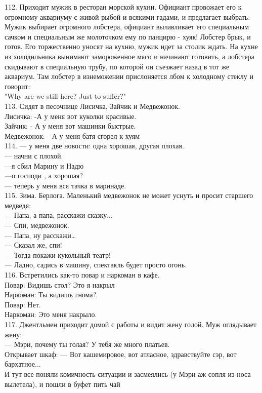 \documentclass[a4paper,20pt,notitlepage]{extbook}
\begin{document}
	112. Приходит мужик в ресторан морской кухни.  Официант провожает его к огромному аквариуму с живой рыбой и всякими гадами, и предлагает выбрать.  Мужик выбирает огромного лобстера, официант вылавливает его специальным сачком и специальным же молоточком ему по панцирю - хуяк! Лобстер брык, и готов. Его торжественно уносят на кухню, мужик идет за столик ждать.  На кухне из холодильника вынимают замороженное мясо и начинают готовить, а лобстера скидывают в специальную трубу, по которой он съезжает назад в тот же аквариум.  Там лобстер в изнеможении прислоняется лбом к холодному стеклу и говорит:\\
	 "Why are we still here? Just to suffer?"\\
	 
	113. Сидят в песочнице Лисичка, Зайчик и Медвежонок.\\
	Лисичка: -А у меня вот куколки красивые.\\
	Зайчик: - А у меня вот машинки быстрые.\\
	Медвежонок: - А у меня батя сгорел к хуям\\
	
	114. — у меня две новости: одна хорошая, другая плохая.\\
	— начни с плохой.\\
	—я сбил Марину и Надю\\
	—о господи , а хорошая?\\
	— теперь у меня вся тачка в маринаде.\\
	
	115. Зима. Берлога. Маленький медвежонок не может уснуть и просит старшего медведя:\\
	— Папа, а папа, расскажи сказку...\\
	— Спи, медвежонок.\\
	— Папа, ну расскажи…\\
	— Сказал же, спи!\\
	— Тогда покажи кукольный театр!\\
	— Ладно, садись в машину, спектакль будет просто огонь.\\
	
	116. Встретились как-то повар и наркоман в кафе.\\
	Повар: Видишь стол? Это я накрыл\\
	Наркоман: Ты видишь гнома?\\
	Повар: Нет.\\
	Наркоман: Это меня накрыло.\\
	
	117. Джентльмен приходит домой с работы и видит жену голой. Муж оглядывает жену: \\
	— Мэри, почему ты голая? У тебя же много платьев. \\
	Открывает шкаф: — Вот кашемировое, вот атласное, здравствуйте сэр, вот бархатное...\\
	И тут все поняли комичность ситуации и засмеялись (у Мэри аж сопля из носа вылетела), и пошли в буфет пить чай\\
	
\end{document}
